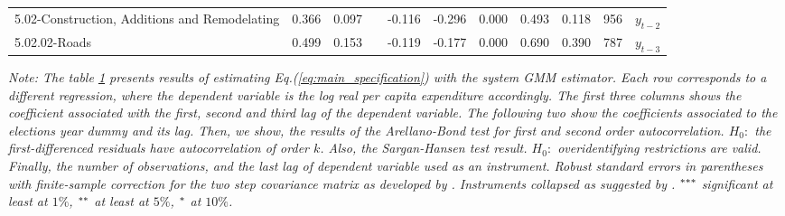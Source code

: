 \begin{table}[ht]
\begin{center}
{\begin{tabular}{lcccccccccc}
\hspace{2mm}5.02-Construction, Additions and Remodelating          & 0.366\sym{***}  & 0.097     &           & -0.116          & -0.296\sym{**}            & 0.000 & 0.493 & 0.118              & 956  & $y_{t-2}$   \\
\hspace{4mm}5.02.02-Roads                                          & 0.499\sym{***}  & 0.153\sym{***}  &           & -0.119          & -0.177              & 0.000 & 0.690 & 0.390              & 787  & $y_{t-3}$  \\
\hline
\hline
\end{tabular}}
\end{center}
\label{table:regressions}
\footnotesize
\textit{Note: The table \ref{table:regressions} presents results of estimating Eq.(\ref{eq:main_specification}) with the \textcite{blundell1998} system GMM estimator. Each row corresponds to a different regression, where the dependent variable is the log real per capita expenditure accordingly. The first three columns shows the coefficient associated with the first, second and third lag of the dependent variable. The following two show the coefficients associated to the elections year dummy and its lag. Then, we show, the results of the Arellano-Bond test for first and second order autocorrelation. $H_0:$ the first-differenced residuals have autocorrelation of order $k$. Also, the Sargan-Hansen test result. $H_0:$ overidentifying restrictions are valid. Finally, the number of observations, and the last lag of dependent variable used as an instrument. Robust standard errors in parentheses with finite-sample correction for the two step covariance matrix as developed by \textcite{windmeijer2005}. Instruments collapsed as suggested by \textcite{roodman2009}.   $\sym{***}$ significant at least at $1\%$, $\sym{**}$ at least at $5\%$, $\sym{*}$ at $10\%$. }
\end{table}

